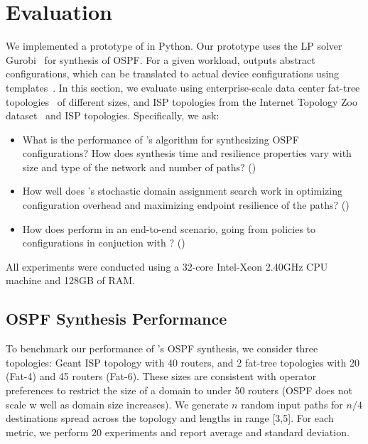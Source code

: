 \section{Evaluation}
 \label{sec:evaluation}
 
 We implemented a 
 prototype of \name in Python. Our prototype uses the LP solver Gurobi~\cite{gurobi} for synthesis of 
 OSPF.   For a given
 workload, \name outputs abstract configurations, which
can be 
 translated to actual device configurations using templates~\cite{template}.
In this section, we evaluate \Name using
enterprise-scale data
center fat-tree topologies~\cite{fattree} of different 
sizes, and ISP topologies from the Internet Topology Zoo 
dataset~\cite{zoo} and ISP topologies.  
Specifically, we ask:
\begin{itemize}
	\item What is the performance of \Name's algorithm for synthesizing
	OSPF configurations? How does synthesis time and resilience properties 
	vary with size and type of the network and number of paths? ()
	
	\item How well does \name's stochastic domain assignment 
	search work in optimizing configuration overhead
	and maximizing endpoint resilience of the paths? ()
	
	\item How does \name perform in an end-to-end scenario, going
	from policies to configurations in conjuction with \genesis? 
	()
\end{itemize}
All experiments were conducted using a
32-core Intel-Xeon 2.40GHz CPU machine and
128GB of RAM.

\subsection{OSPF Synthesis Performance}
To benchmark our performance of \name's OSPF synthesis,
we consider three topologies: Geant ISP topology with 40 routers,
and 2 fat-tree topologies with 20 (Fat-4) and 45 routers (Fat-6). 
These sizes are consistent with operator preferences to restrict
the size of a domain to under 50 routers (OSPF does not scale w
well as domain size increases). We generate $n$ random input paths for
$n/4$ destinations spread across the topology and 
lengths in range [3,5]. For each metric, we perform 20 experiments
and report average and standard deviation. 

